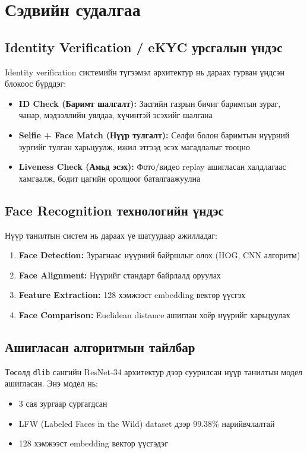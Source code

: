\documentclass[12pt,a4paper]{article}
\begin{document}
\section{Сэдвийн судалгаа}

\subsection{Identity Verification / eKYC урсгалын үндэс}

Identity verification системийн түгээмэл архитектур нь дараах гурван үндсэн блокоос бүрддэг:

\begin{itemize}[leftmargin=1cm]
  \item \textbf{ID Check (Баримт шалгалт):} Засгийн газрын бичиг баримтын зураг, чанар, мэдээллийн уялдаа, хүчинтэй эсэхийг шалгана
  \item \textbf{Selfie + Face Match (Нүүр тулгалт):} Селфи болон баримтын нүүрний зургийг тулган харьцуулж, ижил этгээд эсэх магадлалыг тооцно
  \item \textbf{Liveness Check (Амьд эсэх):} Фото/видео replay ашигласан халдлагаас хамгаалж, бодит цагийн оролцоог баталгаажуулна
\end{itemize}

\subsection{Face Recognition технологийн үндэс}

Нүүр танилтын систем нь дараах үе шатуудаар ажилладаг:

\begin{enumerate}[leftmargin=1.2cm]
  \item \textbf{Face Detection:} Зурагнаас нүүрний байршлыг олох (HOG, CNN алгоритм)
  \item \textbf{Face Alignment:} Нүүрийг стандарт байрлалд оруулах
  \item \textbf{Feature Extraction:} 128 хэмжээст embedding вектор үүсгэх
  \item \textbf{Face Comparison:} Euclidean distance ашиглан хоёр нүүрийг харьцуулах
\end{enumerate}

\subsection{Ашигласан алгоритмын тайлбар}

Төсөлд \texttt{dlib} сангийн ResNet-34 архитектур дээр суурилсан нүүр танилтын модел ашигласан. Энэ модел нь:
\begin{itemize}[leftmargin=1cm]
  \item 3 сая зургаар сургагдсан
  \item LFW (Labeled Faces in the Wild) dataset дээр 99.38\% нарийвчлалтай
  \item 128 хэмжээст embedding вектор үүсгэдэг
\end{itemize}
\end{document}
